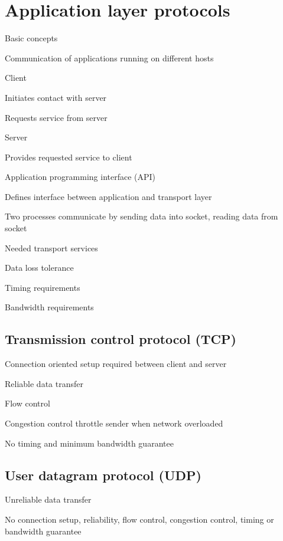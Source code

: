 \section{Application layer protocols}
\enumstart
	\item Basic concepts
	\enumstart
		\item Communication of applications running on different hosts
		\item Client
		\enumstart
			\item Initiates contact with server
			\item Requests service from server
		\enumend
		\item Server
		\enumstart
			\item Provides requested service to client
		\enumend
		\item Application programming interface (API)
		\enumstart
			\item Defines interface between application and transport layer
			\item Two processes communicate by sending data into socket, reading data from socket
		\enumend
		\item Needed transport services
		\enumstart
			\item Data loss tolerance
			\item Timing requirements
			\item Bandwidth requirements
		\enumend
	\enumend
\enumend

\subsection{Transmission control protocol (TCP)}
\enumstart
	\item Connection oriented \arrow setup required between client and server
	\item Reliable data transfer
	\item Flow control
	\item Congestion control \arrow throttle sender when network overloaded
	 \item No timing and minimum bandwidth guarantee
\enumend

\subsection{User datagram protocol (UDP)}
\enumstart
	\item Unreliable data transfer
	\item No connection setup, reliability, flow control, congestion control, timing or bandwidth guarantee
\enumend

